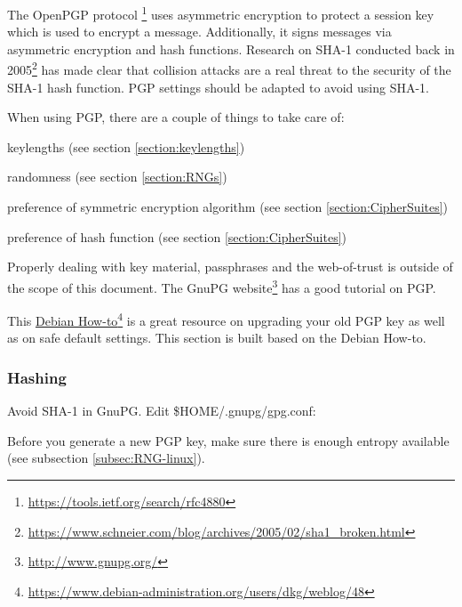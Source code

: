 \gdef\currentsectionname{GPG}
\gdef\currentsubsectionname{GnuPG}

The OpenPGP protocol
\footnote{\url{https://tools.ietf.org/search/rfc4880}}
 uses asymmetric encryption to protect a session key which is used to encrypt a message. Additionally, it signs messages via asymmetric encryption and hash functions. %
Research on SHA-1 conducted back in 2005\footnote{\url{https://www.schneier.com/blog/archives/2005/02/sha1\_broken.html}} has made clear that collision attacks are a real threat to the security of the SHA-1 hash function. PGP settings should be adapted to avoid using SHA-1.


When using PGP, there are a couple of things to take care of:
\begin{itemize*}
  \item keylengths (see section \ref{section:keylengths})
  \item randomness (see section \ref{section:RNGs})
  \item preference of symmetric encryption algorithm (see section \ref{section:CipherSuites})
  \item preference of hash function (see section \ref{section:CipherSuites})
\end{itemize*}

Properly dealing with key material, passphrases and the web-of-trust is outside of the scope of this document. The GnuPG website\footnote{\url{http://www.gnupg.org/}} has a good tutorial on PGP.

This \href{https://www.debian-administration.org/users/dkg/weblog/48}{Debian How-to}\footnote{\url{https://www.debian-administration.org/users/dkg/weblog/48}} is a great resource on upgrading your old PGP key as well as on safe default settings. This section is built based on the Debian How-to.

\subsubsection{Hashing}
Avoid SHA-1 in GnuPG. Edit \$HOME/.gnupg/gpg.conf:


Before you generate a new PGP key, make sure there is enough entropy available (see subsection \ref{subsec:RNG-linux}).


